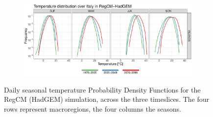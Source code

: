 \begin{figure}
\begin{subfigure}{0.8\textwidth}
        \includegraphics[width=\textwidth]{figures/change_rcm/tas/pdf_ISLANDS_lines}
    \end{subfigure}
    \decoRule
    \caption[Validation of temperature PDFs]{
        Daily seasonal temperature Probability Density Functions for the RegCM (HadGEM) simulation, across the three timeslices. The four rows represent macroregions, the four columns the seasons.
    }\label{fig:change_rcm_tas_pdf}
\end{figure}
